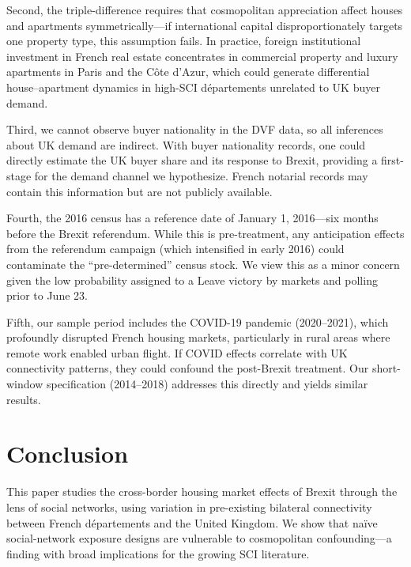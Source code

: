 \documentclass[12pt]{article}
\begin{document}
Second, the triple-difference requires that cosmopolitan appreciation affect houses and apartments symmetrically---if international capital disproportionately targets one property type, this assumption fails. In practice, foreign institutional investment in French real estate concentrates in commercial property and luxury apartments in Paris and the C\^ote d'Azur, which could generate differential house--apartment dynamics in high-SCI d\'epartements unrelated to UK buyer demand.

Third, we cannot observe buyer nationality in the DVF data, so all inferences about UK demand are indirect. With buyer nationality records, one could directly estimate the UK buyer share and its response to Brexit, providing a first-stage for the demand channel we hypothesize. French notarial records may contain this information but are not publicly available.

Fourth, the 2016 census has a reference date of January 1, 2016---six months before the Brexit referendum. While this is pre-treatment, any anticipation effects from the referendum campaign (which intensified in early 2016) could contaminate the ``pre-determined'' census stock. We view this as a minor concern given the low probability assigned to a Leave victory by markets and polling prior to June 23.

Fifth, our sample period includes the COVID-19 pandemic (2020--2021), which profoundly disrupted French housing markets, particularly in rural areas where remote work enabled urban flight. If COVID effects correlate with UK connectivity patterns, they could confound the post-Brexit treatment. Our short-window specification (2014--2018) addresses this directly and yields similar results.


\section{Conclusion}\label{sec:conclusion}

This paper studies the cross-border housing market effects of Brexit through the lens of social networks, using variation in pre-existing bilateral connectivity between French d\'epartements and the United Kingdom. We show that na\"ive social-network exposure designs are vulnerable to cosmopolitan confounding---a finding with broad implications for the growing SCI literature.
\end{document}
